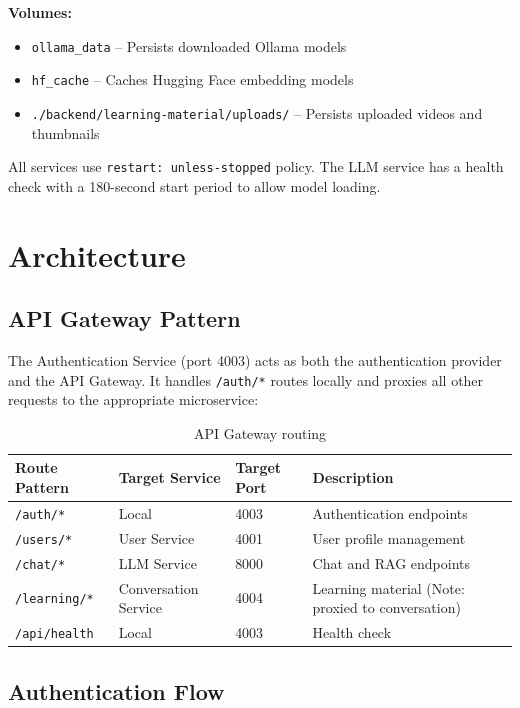 \documentclass[a4paper,12pt]{report}
\begin{document}
\textbf{Volumes:}
\begin{itemize}
    \item \texttt{ollama\_data} -- Persists downloaded Ollama models
    \item \texttt{hf\_cache} -- Caches Hugging Face embedding models
    \item \texttt{./backend/learning-material/uploads/} -- Persists uploaded videos and thumbnails
\end{itemize}

All services use \texttt{restart: unless-stopped} policy. The LLM service has a health check with a 180-second start period to allow model loading.

\section{Architecture}

\subsection{API Gateway Pattern}

The Authentication Service (port 4003) acts as both the authentication provider and the API Gateway. It handles \texttt{/auth/*} routes locally and proxies all other requests to the appropriate microservice:

\begin{table}[H]
\centering
\begin{tabularx}{\textwidth}{lllX}
    \toprule
    \textbf{Route Pattern} & \textbf{Target Service} & \textbf{Target Port} & \textbf{Description} \\
    \midrule
    \texttt{/auth/*} & Local & 4003 & Authentication endpoints \\
    \texttt{/users/*} & User Service & 4001 & User profile management \\
    \texttt{/chat/*} & LLM Service & 8000 & Chat and RAG endpoints \\
    \texttt{/learning/*} & Conversation Service & 4004 & Learning material (Note: proxied to conversation) \\
    \texttt{/api/health} & Local & 4003 & Health check \\
    \bottomrule
\end{tabularx}
\caption{API Gateway routing}
\end{table}

\subsection{Authentication Flow}
\end{document}
